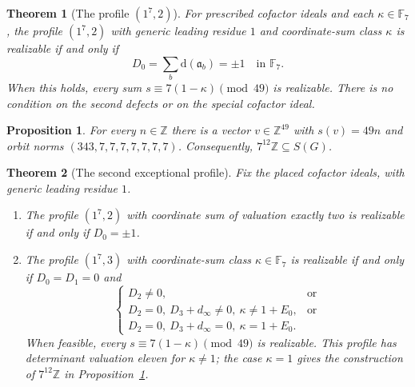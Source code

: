\documentclass[10pt,a4paper]{amsart}
\newtheorem{theorem}{Theorem}
\newtheorem{proposition}{Proposition}
\newcommand{\F}{\mathbb F}
\newcommand{\GG}{G}
\newcommand{\Z}{\mathbb Z}
\newcommand{\dd}{\mathrm d}
\begin{document}
\begin{theorem}[The profile $(1^7,2)$]\label{thm:crit10}
For prescribed cofactor ideals and each $\kappa\in\F_7$, the profile
$(1^7,2)$ with generic leading residue $1$ and coordinate-sum class
$\kappa$ is realizable if and only if
\[
 D_0=\sum_b\dd(\mathfrak a_b)=\pm1\quad\text{in }\F_7.
\]
When this holds, every sum $s\equiv7(1-\kappa)\pmod{49}$ is
realizable. There is no condition on the second defects or on
the special cofactor ideal.
\end{theorem}

\begin{proposition}\label{prop:witness12}
For every $n\in\Z$ there is a vector $v\in\Z^{49}$ with
$s(v)=49n$ and orbit norms $(343,7,7,7,7,7,7,7)$. Consequently,
$7^{12}\Z\subseteq S(\GG)$.
\end{proposition}

\begin{theorem}[The second exceptional profile]\label{thm:crit11}
Fix the placed cofactor ideals, with generic leading residue $1$.
\begin{enumerate}
\item[(a)] The profile $(1^7,2)$ with coordinate sum of valuation
exactly two is realizable if and only if $D_0=\pm1$.
\item[(b)] The profile $(1^7,3)$ with coordinate-sum class
$\kappa\in\F_7$ is realizable if and only if $D_0=D_1=0$ and
\[
 \begin{cases}
 D_2\ne0, &\text{or}\\
 D_2=0,\ D_3+d_\infty\ne0,\ \kappa\ne1+E_0, &\text{or}\\
 D_2=0,\ D_3+d_\infty=0,\ \kappa=1+E_0.
 \end{cases}
\]
When feasible, every $s\equiv7(1-\kappa)\pmod{49}$ is realizable.
This profile has determinant valuation eleven for $\kappa\ne1$;
the case $\kappa=1$ gives the construction of $7^{12}\Z$ in
Proposition~\ref{prop:witness12}.
\end{enumerate}
\end{theorem}
\end{document}
